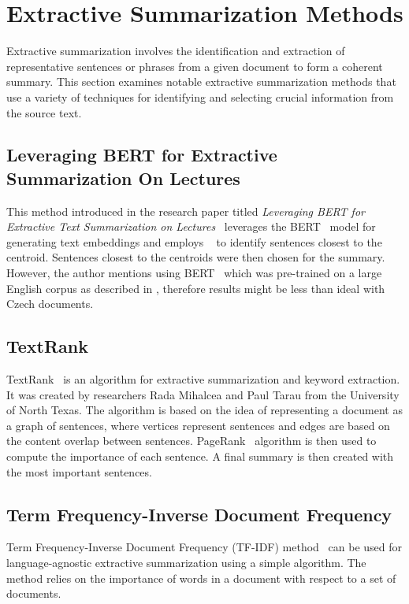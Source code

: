 \documentclass[english, ba, kiv, he, iso690numb, pdf, viewonly]{fasthesis}
\begin{document}
\section{Extractive Summarization Methods}
Extractive summarization involves the identification and extraction of representative sentences or phrases from a given document to form a coherent summary. This section examines notable extractive summarization methods that use a variety of techniques for identifying and selecting crucial information from the source text.
\subsection{Leveraging BERT for Extractive Summarization On Lectures} \label{bertlecturesummary}
This method introduced in the research paper titled \textit{Leveraging BERT for Extractive Text Summarization on
Lectures}~\cite{miller2019leveraging} leverages the BERT~\cite{devlin2019bert} model for generating text embeddings and employs ~\cite{Jin2010} to identify sentences closest to the centroid. Sentences closest to the centroids were then chosen for the summary. However, the author mentions using BERT~\cite{devlin2019bert} which was pre-trained on a large English corpus as described in \cite{devlin2019bert}, therefore results might be less than ideal with Czech documents.

\subsection{TextRank}\label{textrank}
TextRank~\cite{mihalcea-tarau-2004-textrank} is an algorithm for extractive summarization and keyword extraction. It was created by researchers Rada Mihalcea and Paul Tarau from the University of North Texas. The algorithm is based on the idea of representing a document as a graph of sentences, where vertices represent sentences and edges are based on the content overlap between sentences. PageRank~\cite{Page1999ThePC} algorithm is then used to compute the importance of each sentence. A final summary is then created with the most important sentences. 

\subsection{Term Frequency-Inverse Document Frequency}
Term Frequency-Inverse Document Frequency (TF-IDF) method~\cite{ChristianTFIDFSumm2016} can be used for language-agnostic extractive summarization using a simple algorithm. The method relies on the importance of words in a document with respect to a set of documents. 
\end{document}
